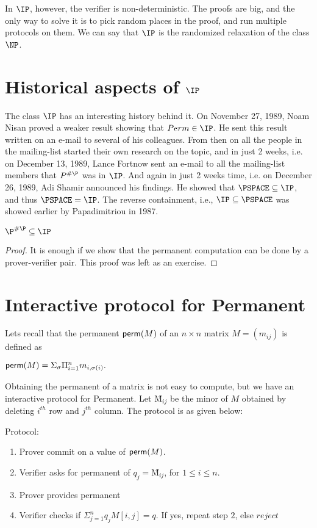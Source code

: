 \documentclass[11pt]{article}
\newcommand{\perm}{{\sf perm}}
\begin{document}
In $\IP$, however, the verifier is non-deterministic. The proofs are big, and the only way to solve
it is to pick random places in the proof, and run multiple protocols on them. We can say that $\IP$
is the randomized relaxation of the class $\NP$.

\section{Historical aspects of $\IP$}
The class $\IP$ has an interesting history behind it. On November 27, 1989, Noam Nisan proved a
weaker result showing that $Perm \in \IP$. He sent this result written on an e-mail to several of
his colleagues. From then on all the people in the mailing-list started their own research on the
topic, and in just 2 weeks, i.e. on December 13, 1989, Lance Fortnow sent an e-mail to all the
mailing-list members that $P^{\#\P}$ was in $\IP$. And again in just 2 weeks time, i.e. on December
26, 1989, Adi Shamir announced his findings. He showed that $\PSPACE \subseteq \IP$, and thus
$\PSPACE = \IP$. The reverse containment, i.e., $\IP \subseteq \PSPACE$ was showed earlier by
Papadimitriou in 1987.

\begin{theorem}
 $\P^{\#\P} \subseteq \IP$
\end{theorem}
\begin{proof}
It is enough if we show that the permanent computation can be done by a prover-verifier pair. This
proof was left as an exercise. 
\end{proof}

\section{Interactive protocol for Permanent}
Lets recall that the permanent $\perm(M)$ of an $n \times n$ matrix $M = (m_{ij})$ is defined
as 
\begin{center}
 \begin{math}
  \perm(M) = \Sigma_\sigma \Pi^{n}_{i=1} m_{i, \sigma(i)}.
 \end{math}
\end{center}
Obtaining the permanent of a matrix is not easy to compute, but we have an interactive protocol for
Permanent. Let \~{M}$_{ij}$ be the minor of $M$ obtained by deleting $i^{th}$ row and $j^{th}$
column. The protocol is as given below:

Protocol:
\begin{enumerate}
 \item Prover commit on a value of $\perm(M)$.
 \item Verifier asks for permanent of $q_j = $\~{M}$_{ij}$, for $1 \leq i \leq n$.
 \item Prover provides permanent
 \item Verifier checks if $\Sigma_{j = 1}^{n} q_j M[i, j] = q$. If yes, repeat step $2$, else
$reject$
\end{enumerate}
\end{document}
